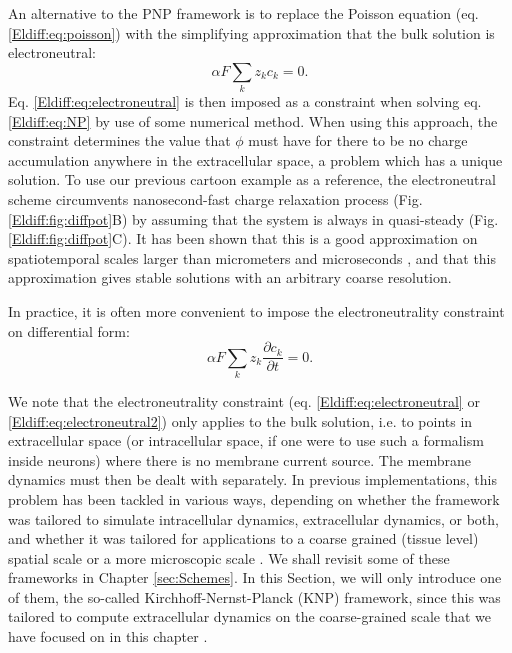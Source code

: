 \subsubsection{}

An alternative to the PNP framework is to replace the Poisson equation (eq. \ref{Eldiff:eq:poisson}) with the simplifying approximation that the bulk solution is electroneutral:
\begin{equation}
\alpha F \sum_k z_k c_k = 0.
\label{Eldiff:eq:electroneutral}
\end{equation}
Eq. \ref{Eldiff:eq:electroneutral} is then imposed as a constraint when solving eq. \ref{Eldiff:eq:NP} by use of some numerical method. When using this approach, the constraint determines the value that $\phi$ must have for there to be no charge accumulation anywhere in the extracellular space, a problem which has a unique solution. To use our previous cartoon example as a reference, the electroneutral scheme circumvents nanosecond-fast charge relaxation process (Fig. \ref{Eldiff:fig:diffpot}B) by assuming that the system is always in quasi-steady (Fig. \ref{Eldiff:fig:diffpot}C). It has been shown that this is a good approximation on spatiotemporal scales larger than micrometers and microseconds \citep{Grodzinsky2011, Pods2017, Solbra2018}, and that this approximation gives stable solutions with an arbitrary coarse resolution.

In practice, it is often more convenient to impose the electroneutrality constraint on differential form:
\begin{equation}
\alpha F \sum_k{z_k \frac{\partial c_k}{\partial t}} = 0.
\label{Eldiff:eq:electroneutral2}
\end{equation}

We note that the electroneutrality constraint (eq. \ref{Eldiff:eq:electroneutral} or \ref{Eldiff:eq:electroneutral2}) only applies to the bulk solution, i.e. to points in extracellular space (or intracellular space, if one were to use such a formalism inside neurons) where there is no membrane current source. The membrane dynamics must then be dealt with separately. In previous implementations, this problem has been tackled in various ways, depending on whether the framework was tailored to simulate intracellular dynamics, extracellular dynamics, or both, and whether it was tailored for applications to a coarse grained (tissue level) spatial scale or a more microscopic scale \citep{Qian1989, Mori2008, Mori2009, Mori2009a, Mori2011, Halnes2015, Halnes2013, Pods2017, Niederer2013, OConnell2016, Solbra2018, tuttle2019, ellingsrud2020}. We shall revisit some of these frameworks in Chapter \ref{sec:Schemes}. In this Section, we will only introduce one of them, the so-called Kirchhoff-Nernst-Planck (KNP) framework, since this was tailored to compute extracellular dynamics on the coarse-grained scale that we have focused on in this chapter \citep{Solbra2018}.


